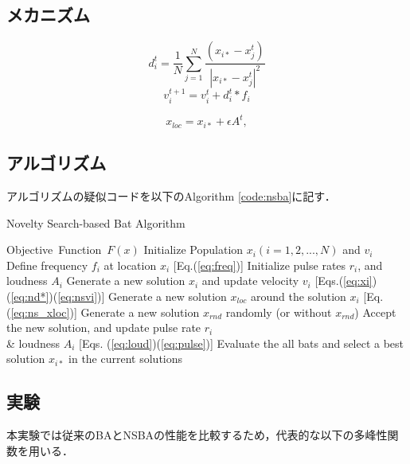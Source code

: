 \documentclass[a4j,11pt]{jarticle}
\begin{document}
\subsection{メカニズム}
\label{ss:NSBA-abst}
\begin{equation}
d_i^{t} = \frac {1}{N} \sum _{j=1}^N \frac {(x_{i*}-x_j^{t})}{|x_{i*}-x_j^{t}|^2}
\label{eq:nd*}
\end{equation}
\begin{equation}
v_i^{t+1}=v_i^{t}+d_i^{t}*f_i
\label{eq:nsvi}
\end{equation}

\begin{equation}
x_{loc}=x_{i*}+ \epsilon A^t,
\label{eq:ns_xloc}
\end{equation}

\subsection{アルゴリズム}
\label{ss:NSBA-algorithm}
アルゴリズムの疑似コードを以下のAlgorithm \ref{code:nsba}に記す．
\begin{algorithm}[H]
\caption{Novelty Search-based Bat Algorithm}
\label{code:nsba}
\begin{algorithmic}[6]
\REQUIRE Objective\ Function\ $F(x)$
\STATE Initialize Population $x_i(i=1,2,..., N)$ and $v_i$\\
\STATE Define frequency $f_i$ at location $x_i$ [Eq.(\ref{eq:freq})]
\STATE Initialize pulse rates $r_i$, and loudness $A_i$
\STATE Generate a new solution $x_i$ and update velocity $v_i$  [Eqs.(\ref{eq:xi})(\ref{eq:nd*})(\ref{eq:nsvi})] 
\STATE Generate a new solution ${x_{loc}}$ around the solution $x_{i}$ [Eq.(\ref{eq:ns_xloc})] 
\ENDIF
\STATE Generate a new solution $x_{rnd}$ randomly (or without ${x_{rnd}}$)
\STATE Accept the new solution, and update pulse rate $r_i$ \\ \& loudness $A_i$ [Eqs. (\ref{eq:loud})(\ref{eq:pulse})] 
\ENDIF
\ENDFOR
\STATE Evaluate the all bats and select a best solution $x_{i*}$ in the current solutions
\ENDWHILE
\end{algorithmic}
\end{algorithm}

\subsection{実験}
\label{ss:NSBA-exp}
本実験では従来のBAとNSBAの性能を比較するため，代表的な以下の多峰性関数を用いる．
\end{document}
